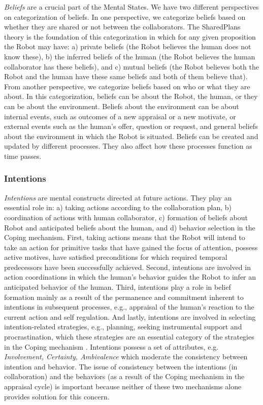\textit{Beliefs} are a crucial part of the Mental States. We have two different
perspectives on categorization of beliefs. In one perspective, we categorize
beliefs based on whether they are shared or not between the collaborators. The
SharedPlans \cite{grosz:plans-discourse} theory is the foundation of this
categorization in which for any given proposition the Robot may have: a) private
beliefs (the Robot believes the human does not know these), b) the inferred
beliefs of the human (the Robot believes the human collaborator has these
beliefs), and c) mutual beliefs (the Robot believes both the Robot and the human
have these same beliefs and both of them believe that). From another
perspective, we categorize beliefs based on who or what they are about. In this
categorization, beliefs can be about the Robot, the human, or they can be about
the environment. Beliefs about the environment can be about internal events,
such as outcomes of a new appraisal or a new motivate, or external events such
as the human's offer, question or request, and general beliefs about the
environment in which the Robot is situated. Beliefs can be created and updated
by different processes. They also affect how these processes function as time
passes.

\subsubsection{Intentions}
\label{sec:intentions}

\textit{Intentions} are mental constructs directed at future actions. They play
an essential role in: a) taking actions according to the collaboration plan, b)
coordination of actions with human collaborator, c) formation of beliefs about
Robot and anticipated beliefs about the human, and d) behavior selection in the
Coping mechanism. First, taking actions means that the Robot will intend to take
an action for primitive tasks that have gained the focus of attention, possess
active motives, have satisfied preconditions for which required temporal
predecessors have been successfully achieved. Second, intentions are involved
in action coordinations in which the human's behavior guides the Robot to infer
an anticipated behavior of the human. Third, intentions play a role in belief
formation mainly as a result of the permanence and commitment inherent to
intentions in subsequent processes, e.g., appraisal of the human's reaction to
the current action and self regulation. And lastly, intentions are involved in
selecting intention-related strategies, e.g., planning, seeking instrumental
support and procrastination, which these strategies are an essential category of
the strategies in the Coping mechanism \cite{marsella:ema-process-model}.
Intentions possess a set of attributes, e.g. \textit{Involvement, Certainty,
Ambivalence} which moderate the consistency between intention and behavior. The
issue of consistency between the intentions (in collaboration) and the behaviors
(as a result of the Coping mechanism in the appraisal cycle) is important
because neither of these two mechanisms alone provides solution for this
concern.

